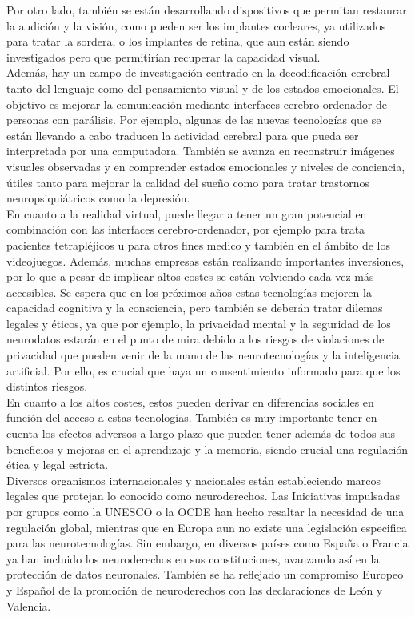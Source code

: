 Por otro lado, también se están desarrollando dispositivos que permitan restaurar la audición y la visión, como pueden ser los implantes cocleares, ya utilizados para tratar la sordera, o los implantes de retina, que aun están siendo investigados pero que permitirían recuperar la capacidad visual.\\

Además, hay un campo de investigación centrado en la decodificación cerebral tanto del lenguaje como del pensamiento visual y de los estados emocionales. El objetivo es mejorar la comunicación mediante interfaces cerebro-ordenador de personas con parálisis. Por ejemplo, algunas de las nuevas tecnologías que se están llevando a cabo traducen la actividad cerebral para que pueda ser interpretada por una computadora. También se avanza en reconstruir imágenes visuales observadas y en comprender estados emocionales y niveles de conciencia, útiles tanto para mejorar la calidad del sueño como para tratar trastornos neuropsiquiátricos como la depresión.\\

En cuanto a la realidad virtual, puede llegar a tener un gran potencial en combinación con las interfaces cerebro-ordenador, por ejemplo para trata pacientes tetrapléjicos u para otros fines medico y también en el ámbito de los videojuegos. Además, muchas empresas están realizando importantes inversiones, por lo que a pesar de implicar altos costes se están volviendo cada vez más accesibles. Se espera que en los próximos años estas tecnologías mejoren la capacidad cognitiva y la consciencia, pero también se deberán tratar dilemas legales y éticos, ya que por ejemplo, la privacidad mental y la seguridad de los neurodatos estarán en el punto de mira debido a los riesgos de violaciones de privacidad que pueden venir de la mano de las neurotecnologías y la inteligencia artificial. Por ello, es crucial que haya un consentimiento informado para que los distintos riesgos.\\

En cuanto a los altos costes, estos pueden derivar en diferencias sociales en función del acceso a estas tecnologías. También es muy importante tener en cuenta los efectos adversos a largo plazo que pueden tener además de todos sus beneficios y mejoras en el aprendizaje y la memoria, siendo crucial una regulación ética y legal estricta.\\

Diversos organismos internacionales y nacionales están estableciendo marcos legales que protejan lo conocido como neuroderechos. Las Iniciativas impulsadas por grupos como la UNESCO o la OCDE han hecho resaltar la necesidad de una regulación global, mientras que en Europa aun no existe una legislación especifica para las neurotecnologías. Sin embargo, en diversos países como España o Francia ya han incluido los neuroderechos en sus constituciones, avanzando así en la protección de datos neuronales. También se ha reflejado un compromiso Europeo y Español de la promoción de neuroderechos con las declaraciones de León y Valencia.\\

